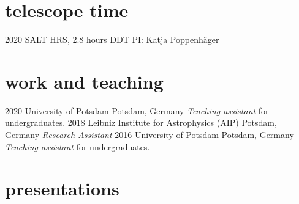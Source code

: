 \documentclass[]{k-cv} %
\begin{document}

\section{telescope time}

\begin{entrylist}
\entry
{2020 }
{SALT HRS, 2.8 hours DDT}
{}
{PI: Katja Poppenh\"ager}


\end{entrylist}

\newpage

\section{work and teaching}

\begin{entrylist}

\entry
{2020}
{University of Potsdam}
{Potsdam, Germany}
{\emph{Teaching assistant} for undergraduates.}
\entry
{2018}
{Leibniz Institute for Astrophysics (AIP)}
{Potsdam, Germany}
{\emph{Research Assistant}}
\entry
{2016 }
{University of Potsdam}
{Potsdam, Germany}
{\emph{Teaching assistant} for undergraduates.}
\end{entrylist}



\section{presentations}
\end{document}
